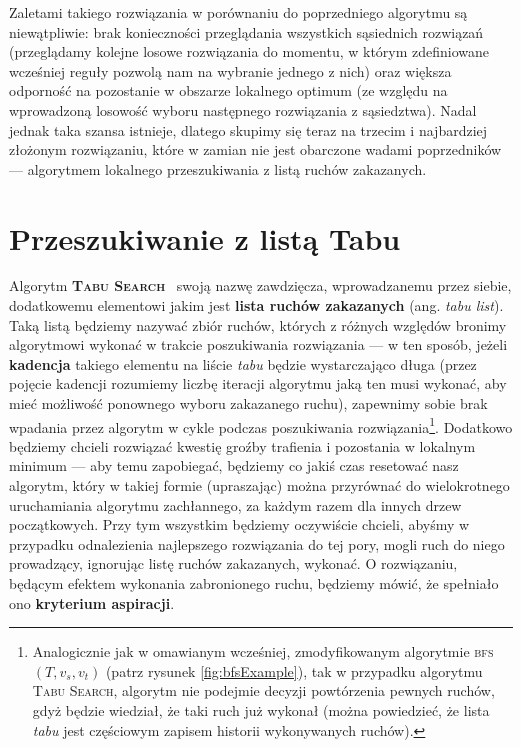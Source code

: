 Zaletami takiego rozwiązania w porównaniu do poprzedniego algorytmu są niewątpliwie: brak konieczności przeglądania wszystkich sąsiednich rozwiązań (przeglądamy kolejne losowe rozwiązania do momentu, w którym zdefiniowane wcześniej reguły pozwolą nam na wybranie jednego z nich) oraz większa odporność na pozostanie w obszarze lokalnego optimum (ze względu na wprowadzoną losowość wyboru następnego rozwiązania z sąsiedztwa). Nadal jednak taka szansa istnieje, dlatego skupimy się teraz na trzecim i najbardziej złożonym rozwiązaniu, które w zamian nie jest obarczone wadami poprzedników --- algorytmem lokalnego przeszukiwania z listą ruchów zakazanych.

\section{Przeszukiwanie z listą Tabu}

Algorytm \textsc{\textbf{Tabu Search}}~\cite{TabuSearch} swoją nazwę zawdzięcza, wprowadzanemu przez siebie, dodatkowemu elementowi jakim jest \textbf{lista ruchów zakazanych} (ang. \textit{tabu list}). Taką listą będziemy nazywać zbiór ruchów, których z różnych względów bronimy algorytmowi wykonać w trakcie poszukiwania rozwiązania --- w ten sposób, jeżeli \textbf{kadencja} takiego elementu na liście \textit{tabu} będzie wystarczająco długa (przez pojęcie kadencji rozumiemy liczbę iteracji algorytmu jaką ten musi wykonać, aby mieć możliwość ponownego wyboru zakazanego ruchu), zapewnimy sobie brak wpadania przez algorytm w cykle podczas poszukiwania rozwiązania\footnote{Analogicznie jak w omawianym wcześniej, zmodyfikowanym algorytmie \textsc{bfs} $\left( T, v_{s}, v_{t} \right)$ (patrz rysunek \ref{fig:bfsExample}), tak w przypadku algorytmu \textsc{Tabu Search}, algorytm nie podejmie decyzji powtórzenia pewnych ruchów, gdyż będzie wiedział, że taki ruch już wykonał (można powiedzieć, że lista \textit{tabu} jest częściowym zapisem historii wykonywanych ruchów).}. Dodatkowo będziemy chcieli rozwiązać kwestię groźby trafienia i pozostania w lokalnym minimum --- aby temu zapobiegać, będziemy co jakiś czas resetować nasz algorytm, który w takiej formie (upraszając) można przyrównać do wielokrotnego uruchamiania algorytmu zachłannego, za każdym razem dla innych drzew początkowych. Przy tym wszystkim będziemy oczywiście chcieli, abyśmy w przypadku odnalezienia najlepszego rozwiązania do tej pory, mogli ruch do niego prowadzący, ignorując listę ruchów zakazanych, wykonać. O rozwiązaniu, będącym efektem wykonania zabronionego ruchu, będziemy mówić, że spełniało ono \textbf{kryterium aspiracji}.


